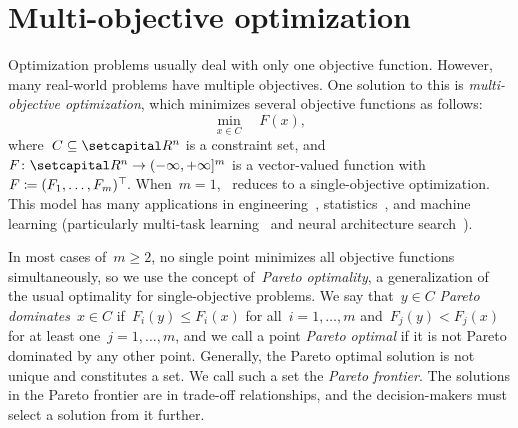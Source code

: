 \documentclass[../../main]{subfiles}
\begin{document}
\section{Multi-objective optimization} 
Optimization problems usually deal with only one objective function.
However, many real-world problems have multiple objectives.
One solution to this is \emph{multi-objective optimization}, which minimizes several objective functions as follows:
\begin{equation} \label{eq:MOO}
    \min_{x \in C} \quad F(x)
,\end{equation} 
where~$C \subseteq \setR^n$ is a constraint set, and $F \colon \setR^n \to (-\infty, +\infty]^m$ is a vector-valued function with~$F \coloneqq (F_1, \dots, F_m)^\top\hspace{-1pt}$.
When~$m = 1$,~ reduces to a single-objective optimization.
This model has many applications in engineering~\cite{Eschenauer1990}, statistics~\cite{Carrizosa1998}, and machine learning (particularly multi-task learning~\cite{Sener2018,Lin2019} and neural architecture search~\cite{Kim2017,Dong2018,Elsken2019}).

In most cases of~$m \ge 2$, no single point minimizes all objective functions simultaneously, so we use the concept of~\emph{Pareto optimality}, a generalization of the usual optimality for single-objective problems.
We say that~$y \in C$ \emph{Pareto dominates}~$x \in C$ if~$F_i(y) \le F_i(x)$ for all~$i = 1, \dots, m$ and~$F_j(y) < F_j(x)$ for at least one~$j = 1, \dots, m$, and we call a point \emph{Pareto optimal} if it is not Pareto dominated by any other point.
Generally, the Pareto optimal solution is not unique and constitutes a set.
We call such a set the \emph{Pareto frontier}.
The solutions in the Pareto frontier are in trade-off relationships, and the decision-makers must select a solution from it further.






\end{document}
